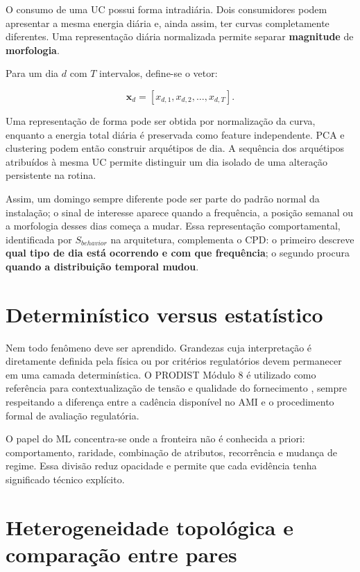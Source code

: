 O consumo de uma UC possui forma intradiária. Dois consumidores podem apresentar a mesma energia diária e, ainda assim, ter curvas completamente diferentes. Uma representação diária normalizada permite separar \textbf{magnitude} de \textbf{morfologia}.

Para um dia \(d\) com \(T\) intervalos, define-se o vetor:

\[\mathbf{x}_d=[x_{d,1},x_{d,2},\ldots,x_{d,T}].\]

Uma representação de forma pode ser obtida por normalização da curva, enquanto a energia total diária é preservada como feature independente. PCA e clustering podem então construir arquétipos de dia. A sequência dos arquétipos atribuídos à mesma UC permite distinguir um dia isolado de uma alteração persistente na rotina.

Assim, um domingo sempre diferente pode ser parte do padrão normal da instalação; o sinal de interesse aparece quando a frequência, a posição semanal ou a morfologia desses dias começa a mudar. Essa representação comportamental, identificada por \(S_{behavior}\) na arquitetura, complementa o CPD: o primeiro descreve \textbf{qual tipo de dia está ocorrendo e com que frequência}; o segundo procura \textbf{quando a distribuição temporal mudou}.

\section{Determinístico versus estatístico}\label{determinuxedstico-versus-estatuxedstico}

Nem todo fenômeno deve ser aprendido. Grandezas cuja interpretação é diretamente definida pela física ou por critérios regulatórios devem permanecer em uma camada determinística. O PRODIST Módulo 8 é utilizado como referência para contextualização de tensão e qualidade do fornecimento \autocite{aneel2026}, sempre respeitando a diferença entre a cadência disponível no AMI e o procedimento formal de avaliação regulatória.

O papel do ML concentra-se onde a fronteira não é conhecida a priori: comportamento, raridade, combinação de atributos, recorrência e mudança de regime. Essa divisão reduz opacidade e permite que cada evidência tenha significado técnico explícito.

\section{Heterogeneidade topológica e comparação entre pares}\label{heterogeneidade-topoluxf3gica-e-comparauxe7uxe3o-entre-pares}

